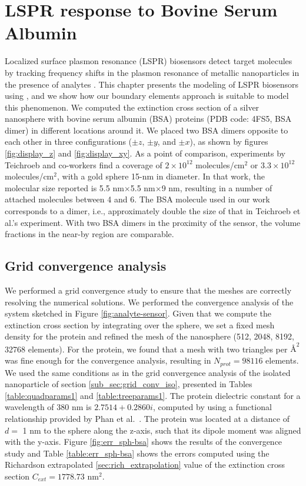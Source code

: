 \section{LSPR response to Bovine Serum Albumin} \label{sec:lspr_response_bsa}

Localized surface plasmon resonance (LSPR) biosensors detect target molecules
by tracking frequency shifts in the plasmon resonance of metallic nanoparticles
in the presence of analytes \cite{WilletsVandyune2007}. This chapter presents the 
modeling of LSPR biosensors using \pygbe, and we show how our boundary elements approach is 
suitable to model this phenomenon. We computed the extinction cross section 
of a silver nanosphere with bovine serum albumin (BSA) proteins (PDB code: 4FS5,
BSA dimer) in different locations around it. We placed two BSA dimers opposite to each other 
in three configurations ($\pm z$, $\pm y$, and $\pm x$), as shown by figures \ref{fig:display_z} and \ref{fig:display_xy}.
As a point of comparison, experiments by Teichroeb and co-workers
\cite{TeichroebETal2008} find a coverage of $2\times 10^{12}$ molecules/cm$^2$ or $3.3\times 10^{12}$ molecules/cm$^2$, 
with a gold sphere 15-nm in diameter. In that work, the molecular size reported is 5.5 nm$\times$5.5 nm$\times$9 nm, resulting in
a number of attached molecules between 4 and 6. The BSA molecule used in our work corresponds to a dimer, i.e., approximately 
double the size of that in Teichroeb et al.'s experiment. With two BSA dimers in the proximity of the sensor, 
the volume fractions in the near-by region are comparable.

\subsection{Grid convergence analysis} \label{sec:grid_conv_bsa}

We performed a grid convergence study to ensure that the meshes are correctly
resolving the numerical solutions. We performed the convergence analysis of
the system sketched in Figure \ref{fig:analyte-sensor}. Given that we 
compute the extinction cross section by integrating over the sphere, we set 
a fixed mesh density for the protein and refined the mesh of the nanosphere 
(512, 2048, 8192, 32768 elements). For the protein, we found that a mesh with
two triangles per $\text{\AA}^2$ was fine enough for the convergence 
analysis, resulting in $N_{prot} = 98116$ elements.
We used the same conditions as in the grid convergence analysis of the 
isolated nanoparticle of section \ref{sub_sec:grid_conv_iso}, presented
in Tables \ref{table:quadparams1} and \ref{table:treeparams1}. The protein 
dielectric constant for a wavelength of 380 nm is $2.7514 + 0.2860 i$,   
computed by using a functional relationship provided by Phan
et al.~\cite{PhanETal2013}. The protein was located at a distance of 
$d=$ 1 nm to the sphere along the z-axis, such that its dipole moment 
was aligned with the y-axis. Figure  \ref{fig:err_sph-bsa} shows the results of the convergence study and 
Table \ref{table:err_sph-bsa} shows the errors computed using the Richardson extrapolated
\ref{sec:rich_extrapolation} value of the extinction cross section $C_{ext}= 1778.73$ nm$^2$.

